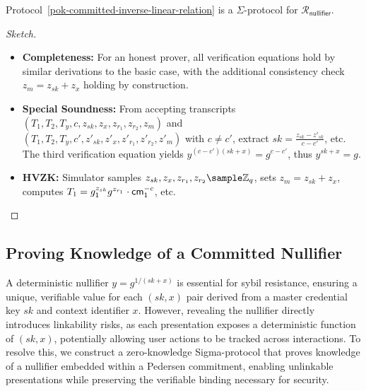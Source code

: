 \begin{theorem}
Protocol~\ref{pok-committed-inverse-linear-relation} is a $\Sigma$-protocol for $\mathcal{R}_{\mathsf{nullifier}}$.
\end{theorem}

\begin{proof}[Sketch]
\begin{itemize}
    \item \textbf{Completeness:} For an honest prover, all verification equations hold by similar derivations to the basic case, with the additional consistency check $z_m = z_{sk} + z_x$ holding by construction.
    
    \item \textbf{Special Soundness:} From accepting transcripts $(T_1, T_2, T_y, c, z_{sk}, z_x, z_{r_1}, z_{r_2}, z_m)$ and \\ $(T_1, T_2, T_y, c', z'_{sk}, z'_x, z'_{r_1}, z'_{r_2}, z'_m)$ with $c \neq c'$, extract $sk = \frac{z_{sk} - z'_{sk}}{c - c'}$, etc. The third verification equation yields $y^{(c - c')(sk + x)} = g^{c - c'}$, thus $y^{sk+x} = g$.

    \item \textbf{HVZK:} Simulator samples $z_{sk}, z_x, z_{r_1}, z_{r_2} \sample \mathbb{Z}_q$, sets $z_m = z_{sk} + z_x$, computes $T_1 = g_1^{z_{sk}}g^{z_{r_1}} \cdot \mathsf{cm}_1^{-c}$, etc.
\end{itemize}
\end{proof}




























\subsection{Proving Knowledge of a Committed Nullifier}

A deterministic nullifier $y = g^{1/(sk + x)}$ is essential for sybil resistance, ensuring a unique, verifiable value for each $(sk, x)$ pair derived from a master credential key $sk$ and context identifier $x$. However, revealing the nullifier directly introduces linkability risks, as each presentation exposes a deterministic function of $(sk, x)$, potentially allowing user actions to be tracked across interactions. To resolve this, we construct a zero-knowledge Sigma-protocol that proves knowledge of a nullifier embedded within a Pedersen commitment, enabling unlinkable presentations while preserving the verifiable binding necessary for security.

